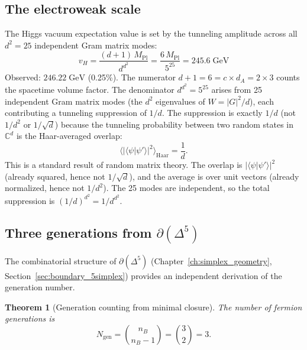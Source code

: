 \documentclass[12pt]{article}
\newtheorem{theorem}{Theorem}[section]
\theoremstyle{remark}
\theoremstyle{definition}
\newcommand{\CC}{\mathbb{C}}
\begin{document}
\subsection{The electroweak scale}

The Higgs vacuum expectation value is set by the tunneling amplitude across all $d^2 = 25$ independent Gram matrix modes:
\begin{equation}
\boxed{v_H = \frac{(d+1)\,M_\text{Pl}}{d^{d^2}} = \frac{6\,M_\text{Pl}}{5^{25}} = 245.6\;\text{GeV}}
\end{equation}
Observed: $246.22\;\text{GeV}$ (0.25\%). The numerator $d + 1 = 6 = c \times d_A = 2 \times 3$ counts the spacetime volume factor. The denominator $d^{d^2} = 5^{25}$ arises from 25 independent Gram matrix modes (the $d^2$ eigenvalues of $W = |G|^2/d$), each contributing a tunneling suppression of $1/d$. The suppression is exactly $1/d$ (not $1/d^2$ or $1/\sqrt{d}$) because the tunneling probability between two random states in $\CC^d$ is the Haar-averaged overlap:
\begin{equation}
\langle|\langle\psi|\psi'\rangle|^2\rangle_\text{Haar} = \frac{1}{d}.
\end{equation}
This is a standard result of random matrix theory. The overlap is $|\langle\psi|\psi'\rangle|^2$ (already squared, hence not $1/\sqrt{d}$), and the average is over unit vectors (already normalized, hence not $1/d^2$). The 25 modes are independent, so the total suppression is $(1/d)^{d^2} = 1/d^{d^2}$.

\subsection{Three generations from $\partial(\Delta^5)$}
\label{sec:three_gen}

The combinatorial structure of $\partial(\Delta^5)$ (Chapter~\ref{ch:simplex_geometry}, Section~\ref{sec:boundary_5simplex}) provides an independent derivation of the generation number.

\begin{theorem}[Generation counting from minimal closure]
\label{thm:gen_count}
The number of fermion generations is
\begin{equation}
N_\mathrm{gen} = \binom{n_B}{n_B - 1} = \binom{3}{2} = 3.
\end{equation}
\end{theorem}
\end{document}

